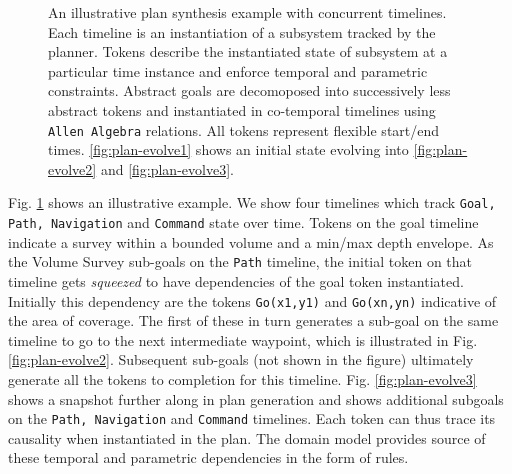 \begin{figure}
\centering 
{} 
\caption{\small An illustrative plan synthesis example with concurrent
  timelines. Each timeline is an instantiation of a subsystem tracked
  by the planner. Tokens describe the instantiated state of subsystem
  at a particular time instance and enforce temporal and parametric
  constraints. Abstract goals are decomoposed into successively less
  abstract tokens and instantiated in co-temporal timelines using
  \texttt{Allen Algebra} relations. All tokens represent flexible
  start/end times. \ref{fig:plan-evolve1} shows an initial state
  evolving into \ref{fig:plan-evolve2} and \ref{fig:plan-evolve3}.}
  \label{fig:Plan-evolve}
  \vskip-5pt
\end{figure}

Fig. \ref{fig:Plan-evolve} shows an illustrative example. We show four
timelines which track \texttt{Goal, Path, Navigation} and
\texttt{Command} state over time. Tokens on the goal timeline indicate
a survey within a bounded volume and a min/max depth envelope. As the
Volume Survey sub-goals on the \texttt{Path} timeline, the initial
token on that timeline gets \emph{squeezed} to have dependencies of
the goal token instantiated. Initially this dependency are the tokens
\texttt{Go(x1,y1)} and \texttt{Go(xn,yn)} indicative of the area of
coverage. The first of these in turn generates a sub-goal on the same
timeline to go to the next intermediate waypoint, which is illustrated
in Fig. \ref{fig:plan-evolve2}. Subsequent sub-goals (not shown in the
figure) ultimately generate all the tokens to completion for this
timeline. Fig. \ref {fig:plan-evolve3} shows a snapshot further along
in plan generation and shows additional subgoals on the \texttt{Path,
  Navigation} and \texttt{Command} timelines. Each token can thus
trace its causality when instantiated in the plan. The domain model
provides source of these temporal and parametric dependencies in the
form of rules. 


